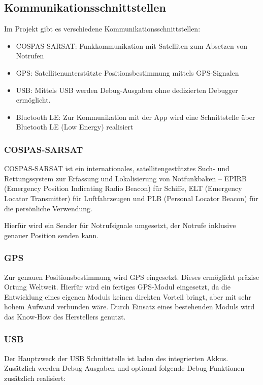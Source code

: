 \subsection{Kommunikationsschnittstellen}

Im Projekt gibt es verschiedene Kommunikationsschnittstellen:
\begin{itemize}
	\item COSPAS-SARSAT: Funkkommunikation mit Satelliten zum Absetzen von Notrufen
	\item GPS: Satellitenunterstützte Positionsbestimmung mittels GPS-Signalen
	\item USB: Mittels USB werden Debug-Ausgaben ohne dedizierten Debugger ermöglicht.
	\item Bluetooth LE: Zur Kommunikation mit der App wird eine Schnittstelle über Bluetooth LE (Low Energy) realisiert	
\end{itemize}

\subsubsection{COSPAS-SARSAT}

COSPAS-SARSAT ist ein internationales, satellitengestütztes Such- und Rettungssystem zur Erfassung und Lokalisierung von Notfunkbaken – EPIRB (Emergency Position Indicating Radio Beacon) für Schiffe, ELT (Emergency Locator Transmitter) für Luftfahrzeugen und PLB (Personal Locator Beacon) für die persönliche Verwendung.

Hierfür wird ein Sender für Notrufsignale umgesetzt, der Notrufe inklusive genauer Position senden kann.

\subsubsection{GPS}

Zur genauen Positionsbestimmung wird GPS eingesetzt. Dieses ermöglicht präzise Ortung Weltweit.
Hierfür wird ein fertiges GPS-Modul eingesetzt, da die Entwicklung eines eigenen Moduls keinen direkten Vorteil bringt, aber mit sehr hohem Aufwand verbunden wäre. Durch Einsatz eines bestehenden Moduls wird das Know-How des Herstellers genutzt.

\subsubsection{USB}

Der Hauptzweck der USB Schnittstelle ist laden des integrierten Akkus. Zusätzlich werden Debug-Ausgaben und optional folgende Debug-Funktionen zusätzlich realisiert:

